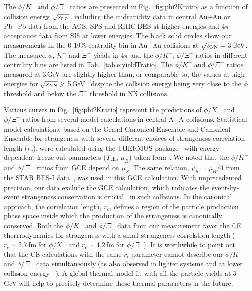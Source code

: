 \documentclass[aps,tightenlines,superscriptaddress,twocolumn]{revtex4-1}
\begin{document}
The $\phi/K^-$ and $\phi/\Xi^-$ ratios are presented in Fig.~\ref{fig:phi2Kratio} as a function of collision energy $\sqrt{s_{\rm NN}}$, including the midrapidity data in central Au+Au or Pb+Pb data from the AGS, SPS and RHIC BES at higher energies and $4\pi$\,acceptance data from SIS at lower energies. The black solid circles show our measurements in the 0-10\% centrality bin in Au+Au collisions at ${\sqrt{s_{\rm NN}} = \rm{3\,GeV}}$. The measured $\phi$, $K^-$ and $\Xi^-$ yields in 4$\pi$ and the $\phi/K^-$, $\phi/\Xi^-$ ratios in different centrality bins are listed in Tab.~\ref{table:yieldTratio}. The $\phi/K^-$ and $\phi/\Xi^-$ ratios measured at 3\,GeV are slightly higher than, or comparable to, the values at high energies for $\sqrt{s_{\rm NN}}\geqslant$ 5\,GeV~\cite{NA49_phi,NA49_piK,NA49_piK2,NA49_Xi,E917_phi,ALICE_phi_2p7TeV,STAR_phi_64a200GeV,Xi_ArKCl_HADES,star_bes_strangeness} despite the collision energy being very close to the $\phi$ threshold and below the $\Xi^-$ threshold in NN collisions. 

Various curves in Fig.~\ref{fig:phi2Kratio} represent the predictions of $\phi/K^-$ and $\phi/\Xi^-$ ratios from several model calculations in central A+A collisions. Statistical model calculations, based on the Grand Canonical Ensemble and Canonical Ensemble for strangeness with several different choices of strangeness correlation length ($r_c$), were calculated using the $\textup{THERMUS}$ package~\cite{THERMUS_WHEATON200984} with energy dependent freeze-out parameters ($T_{\rm ch}$, $\mu_B$) taken from~\cite{Andronic_2018Naure}. 
We noted that the $\phi/K^-$ and $\phi/\Xi^-$ ratios from GCE depend on $\mu_{S}$. The same relation, $\mu_{S}$ = $\mu_{B}/4$ from the STAR BES-I data~\cite{star_bes_strangeness}, was used in this GCE calculation. 
With unprecedented precision, our data exclude the GCE calculation, 
which indicates the event-by-event strangeness conservation 
is crucial~\cite{BraunMunzinger:2003zd} in such collisions. In the canonical approach, the correlation length, $r_c$, defines a region of the particle production phase space inside which the production of the strangeness is canonically conserved. Both the $\phi/K^-$ and $\phi/\Xi^-$ data from our measurement favor the CE thermodynamics for strangeness with a small strangeness correlation length ($r_c \sim 2.7$\,fm for $\phi/K^-$ and $r_c \sim 4.2$\,fm for $\phi/\Xi^-$). It is worthwhile to point out that the CE calculations with the same $r_c$ parameter cannot describe our $\phi/K^-$ and $\phi/\Xi^-$ data simultaneously (as also observed in lighter systems and at lower collision energy ~\cite{HADES_phi_ArKCl}). 
A global thermal model fit with all the particle yields at 3\,GeV will help to precisely determine these thermal parameters in the future.
\end{document}
